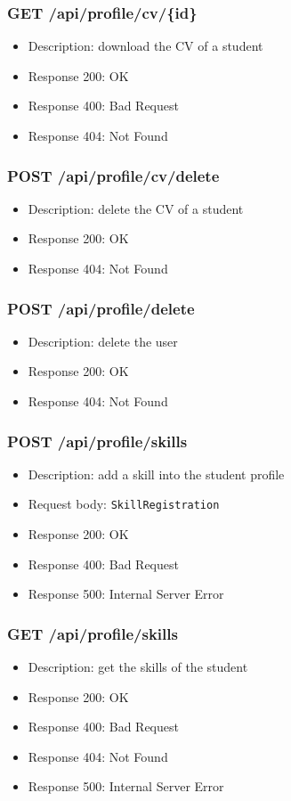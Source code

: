 \subsubsection{GET /api/profile/cv/\{id\}}
\begin{itemize}
    \item Description: download the CV of a student
    \item Response 200: OK
    \item Response 400: Bad Request
    \item Response 404: Not Found
\end{itemize}

\subsubsection{POST /api/profile/cv/delete}
\begin{itemize}
    \item Description: delete the CV of a student
    \item Response 200: OK
    \item Response 404: Not Found
\end{itemize}

\subsubsection{POST /api/profile/delete}
\begin{itemize}
    \item Description: delete the user
    \item Response 200: OK
    \item Response 404: Not Found
\end{itemize}

\subsubsection{POST /api/profile/skills}
\begin{itemize}
    \item Description: add a skill into the student profile
    \item Request body: \verb|SkillRegistration|
    \item Response 200: OK
    \item Response 400: Bad Request
    \item Response 500: Internal Server Error
\end{itemize}

\subsubsection{GET /api/profile/skills}
\begin{itemize}
    \item Description: get the skills of the student
    \item Response 200: OK
    \item Response 400: Bad Request
    \item Response 404: Not Found
    \item Response 500: Internal Server Error
\end{itemize}

